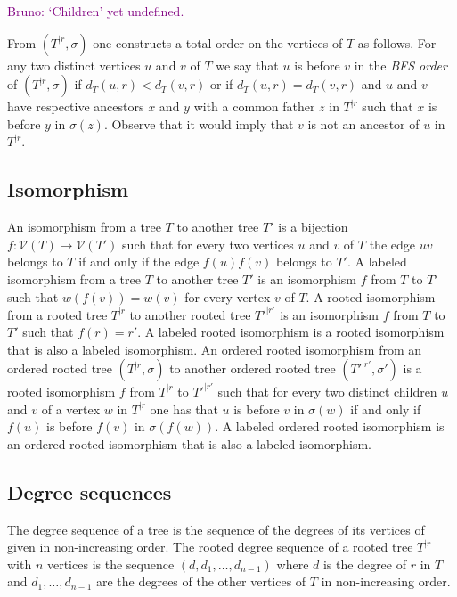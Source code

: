 \documentclass[11 pt]{modarticle}
\newcommand{\vset}{\mathcal{V}}
\newcommand{\wmap}{w}
\newcommand{\distance}[3]{d_{#3}(#1,#2)}
\newcommand{\rtree}[2]{{#1}^{\lvert #2}}
\newcommand{\ortree}[3]{(\rtree{#1}{#2},{#3})}
\newcommand{\bldcomment}[1]{\textcolor{purple}{{\footnotesize Bruno:} #1}}
\begin{document}
\bldcomment{`Children' yet undefined.}

From $\ortree{T}{r}{\sigma}$ one constructs a total order on the vertices of $T$ as follows. For any two distinct vertices $u$ and $v$ of $T$ we say that $u$ is before $v$ in the \textit{BFS order} of $\ortree{T}{r}{\sigma}$ if $\distance{u}{r}{T} < \distance{v}{r}{T}$ or if $\distance{u}{r}{T} = \distance{v}{r}{T}$ and $u$ and $v$ have respective ancestors $x$ and $y$ with a common father $z$ in $\rtree{T}{r}$ such that $x$ is before $y$ in $\sigma(z)$. Observe that it would imply that $v$ is not an ancestor of $u$ in $\rtree{T}{r}$.


\subsection{Isomorphism}

An isomorphism from a tree $T$ to another tree $T'$ is a bijection $f\colon \vset (T) \to \vset (T')$ such that for every two vertices $u$ and $v$ of $T$ the edge $uv$ belongs to $T$ if and only if the edge $f(u)f(v)$ belongs to $T'$. A labeled isomorphism from a tree $T$ to another tree $T'$ is an isomorphism $f$ from $T$ to $T'$ such that $\wmap(f(v)) = \wmap(v)$ for every vertex $v$ of $T$. A rooted isomorphism from a rooted tree $\rtree{T}{r}$ to another rooted tree $\rtree{T'}{r'}$ is an isomorphism $f$ from $T$ to $T'$ such that $f(r) = r'$. A labeled rooted isomorphism is a rooted isomorphism that is also a labeled isomorphism. An ordered rooted isomorphism from an ordered rooted tree $\ortree{T}{r}{\sigma}$ to another ordered rooted tree $\ortree{T'}{r'}{\sigma'}$ is a rooted isomorphism $f$ from $\rtree{T}{r}$ to $\rtree{T'}{r'}$ such that for every two distinct children $u$ and $v$ of a vertex $w$ in $\rtree{T}{r}$ one has that $u$ is before $v$ in $\sigma(w)$ if and only if $f(u)$ is before $f(v)$ in $\sigma(f(w))$. A labeled ordered rooted isomorphism is an ordered rooted isomorphism that is also a labeled isomorphism.

\subsection{Degree sequences}

The degree sequence of a tree %
is the sequence %
of the degrees of its vertices of given in non-increasing order. The rooted degree sequence of a rooted tree $\rtree{T}{r}$ with $n$ vertices is the sequence $(d, d_1, \dots, d_{n-1})$ where $d$ is the degree of $r$ in $T$ and $d_1, \dots, d_{n-1}$ are the degrees of the other vertices of $T$ in non-increasing order.
\end{document}
